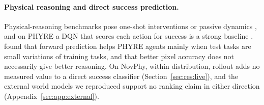 \begin{revblock}
\paragraph{Physical reasoning and direct success prediction.}
Physical-reasoning benchmarks pose one-shot interventions or passive dynamics \citep{bakhtin2019phyre,bear2021physion,yi2020clevrer,pinto2024novphy}, and on PHYRE a DQN that scores each action for success is a strong baseline \citep{bakhtin2019phyre}. \citet{girdhar2020forward} found that forward prediction helps PHYRE agents mainly when test tasks are small variations of training tasks, and that better pixel accuracy does not necessarily give better reasoning. On NovPhy, within distribution, rollout adds no measured value to a direct success classifier (Section~\ref{sec:res:live}), and the external world models we reproduced support no ranking claim in either direction (Appendix~\ref{sec:app:external}).
\end{revblock}
